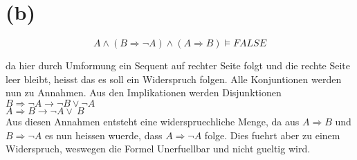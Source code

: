 \documentclass[a4paper,12pt]{article}
\begin{document}
\section*{(b)}

\[
A \land (B \Rightarrow \neg A) \land (A \Rightarrow B) \models FALSE
\]

da hier durch Umformung ein Sequent auf rechter Seite folgt und die rechte Seite leer bleibt,
heisst das es soll ein Widerspruch folgen. Alle Konjuntionen werden nun zu Annahmen. Aus den Implikationen
werden Disjunktionen \\
$B \Rightarrow \neg A \rightarrow \neg B \lor \neg A $ \\
$A \Rightarrow B \rightarrow \neg A \lor \ B$ \\
Aus diesen Annahmen entsteht eine widerspruechliche Menge, da aus $A \Rightarrow B$ und $B \Rightarrow \neg A$ 
es nun heissen wuerde, dass $A \Rightarrow \neg A$ folge. Dies fuehrt aber zu einem Widerspruch, weswegen die Formel Unerfuellbar und nicht gueltig wird. 
\end{document}
